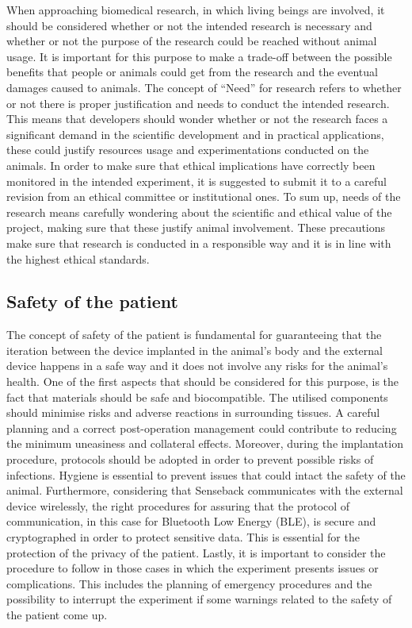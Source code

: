\documentclass{Configuration_Files/PoliMi3i_thesis}
\begin{document}
When approaching biomedical research, in which living beings are involved, it should be considered whether or not the intended research is necessary and whether or not the purpose of the research could be reached without animal usage. It is important for this purpose to make a trade-off between the possible benefits that people or animals could get from the research and the eventual damages caused to animals. 
The concept of “Need” for research refers to whether or not there is proper justification and needs to conduct the intended research. This means that developers should wonder whether or not the research faces a significant demand in the scientific development and in practical applications, these could justify resources usage and experimentations conducted on the animals.
In order to make sure that ethical implications have correctly been monitored in the intended experiment, it is suggested to submit it to a careful revision from an ethical committee or institutional ones. 
To sum up, needs of the research means carefully wondering about the scientific and ethical value of the project, making sure that these justify animal involvement. These precautions make sure that research is conducted in a responsible way and it is in line with the highest ethical standards.

\subsection{Safety of the patient}


The concept of safety of the patient is fundamental for guaranteeing that the iteration between the device implanted in the animal’s body and the external device happens in a safe way and it does not involve any risks for the animal's health.
One of the first aspects that should be considered for this purpose, is the fact that materials should be safe and biocompatible. The utilised components should minimise risks and adverse reactions in surrounding tissues. A careful planning and a correct post-operation management could contribute to reducing the minimum uneasiness and collateral effects.
Moreover, during the implantation procedure, protocols should be adopted in order to prevent possible risks of infections. Hygiene is essential to prevent issues that could intact the safety of the animal.
Furthermore, considering that Senseback communicates with the external device wirelessly, the right procedures for assuring that the protocol of communication, in this case for Bluetooth Low Energy (BLE), is secure and cryptographed in order to protect sensitive data. This is essential for the protection of the privacy of the patient.
Lastly, it is important to consider the procedure to follow in those cases in which the experiment presents issues or complications. This includes the planning of emergency procedures and the possibility to interrupt the experiment if some warnings related to the safety of the patient come up.
\end{document}
